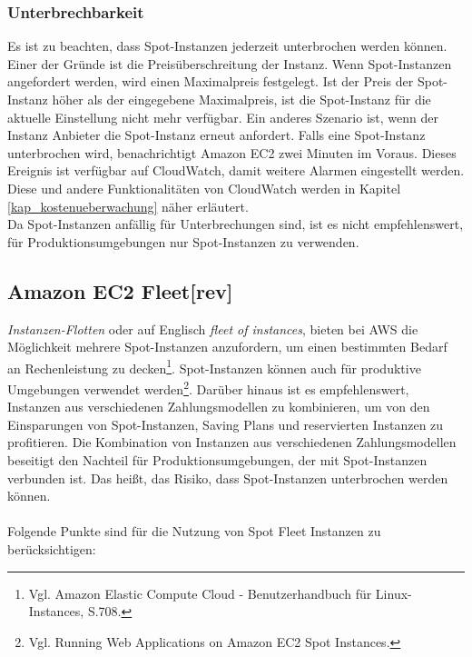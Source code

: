 \subsubsection*{Unterbrechbarkeit}
Es ist zu beachten, dass Spot-Instanzen jederzeit unterbrochen werden können. Einer der Gründe ist die Preisüberschreitung der Instanz. Wenn Spot-Instanzen angefordert werden, wird einen Maximalpreis festgelegt. Ist der Preis der Spot-Instanz höher als der eingegebene Maximalpreis, ist die Spot-Instanz für die aktuelle Einstellung nicht mehr verfügbar. Ein anderes Szenario ist, wenn der Instanz Anbieter die Spot-Instanz erneut anfordert. Falls eine Spot-Instanz unterbrochen wird, benachrichtigt Amazon EC2 zwei Minuten im Voraus. Dieses Ereignis ist verfügbar auf CloudWatch, damit weitere Alarmen eingestellt werden. Diese und andere Funktionalitäten von CloudWatch werden in Kapitel \ref{kap_kostenueberwachung} näher erläutert.
\\
Da Spot-Instanzen anfällig für Unterbrechungen sind, ist es nicht empfehlenswert, für Produktionsumgebungen nur Spot-Instanzen zu verwenden.


\subsection{Amazon EC2 Fleet[rev]} \label{sssec:AWS-EC2-Fleet}
\textit{Instanzen-Flotten} oder auf Englisch \textit{fleet of instances}, bieten bei AWS die Möglichkeit mehrere Spot-Instanzen anzufordern, um einen bestimmten Bedarf an Rechenleistung zu decken\footnote{Vgl. Amazon Elastic Compute Cloud - Benutzerhandbuch für Linux-Instances, S.708\cite{AMZ26}.}. Spot-Instanzen können auch für produktive Umgebungen verwendet werden\footnote{Vgl.  Running Web Applications on Amazon EC2 Spot Instances\cite{AMZ24}.}. Darüber hinaus ist es empfehlenswert, Instanzen aus verschiedenen Zahlungsmodellen zu kombinieren, um von den Einsparungen von Spot-Instanzen, Saving Plans und reservierten Instanzen zu profitieren. Die Kombination von Instanzen aus verschiedenen Zahlungsmodellen beseitigt den Nachteil für Produktionsumgebungen, der mit Spot-Instanzen verbunden ist. Das heißt, das Risiko, dass Spot-Instanzen unterbrochen werden können.
\\\\
Folgende Punkte sind für die Nutzung von Spot Fleet Instanzen zu berücksichtigen:
